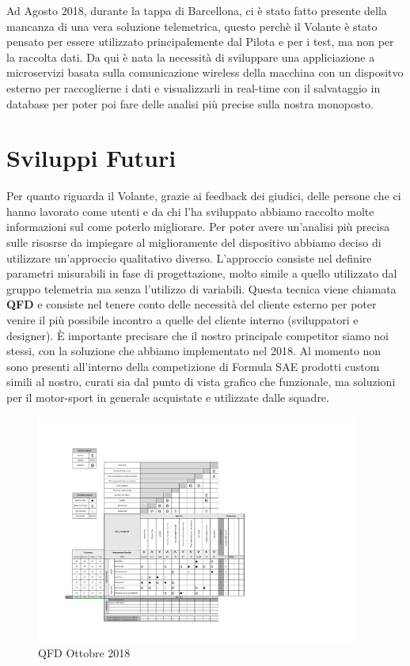 Ad Agosto 2018, durante la tappa di Barcellona, ci è stato fatto presente della mancanza di una vera soluzione telemetrica, questo perchè il Volante
è stato pensato per essere utilizzato principalemente dal Pilota e per i test, ma non per la raccolta dati. 
Da qui è nata la necessità di sviluppare una appliciazione a microservizi basata sulla comunicazione wireless della macchina 
con un dispositvo esterno per raccoglierne i dati e visualizzarli in real-time con il salvataggio in database per poter poi fare delle analisi più
precise sulla nostra monoposto.

\section{Sviluppi Futuri}

Per quanto riguarda il Volante, grazie ai feedback dei giudici, delle persone che ci hanno lavorato come utenti e da chi l'ha sviluppato abbiamo raccolto
molte informazioni sul come poterlo migliorare.
Per poter avere un'analisi più precisa sulle risosrse da impiegare al miglioramente del dispositivo
abbiamo deciso di utilizzare un'approccio qualitativo diverso.
L'approccio consiste nel definire parametri misurabili in fase di progettazione, molto simile a quello utilizzato dal gruppo telemetria 
ma senza l'utilizzo di variabili.
Questa tecnica viene chiamata \textbf{QFD} e consiste nel tenere conto delle necessità del cliente esterno 
per poter venire il più possibile incontro a quelle del cliente interno (sviluppatori e designer).
È importante precisare che il nostro principale competitor siamo noi stessi, con la soluzione che abbiamo 
implementato nel 2018.
Al momento non sono presenti all'interno della competizione di Formula SAE prodotti custom simili al nostro,
curati sia dal punto di vista grafico che funzionale, ma soluzioni per il motor-sport in generale acquistate e utilizzate dalle squadre.

\begin{figure}[hbt!]
    \centering
    \includegraphics[width=0.95\textwidth]{./figures/QFD_Telemetry.pdf}
    \caption{QFD Ottobre 2018}
\end{figure}

